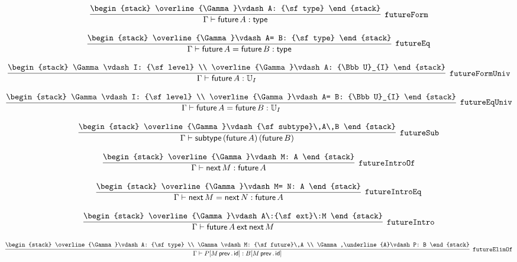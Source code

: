 \[
\infer[{\tt futureForm}]{\Gamma \vdash {\sf future}\,A: {\sf type}}{
\begin{stack}
\overline{\Gamma}\vdash A: {\sf type}
\end{stack}}
\]

\[
\infer[{\tt futureEq}]{\Gamma \vdash {\sf future}\,A= {\sf future}\,B: {\sf type}}{
\begin{stack}
\overline{\Gamma}\vdash A= B: {\sf type}
\end{stack}}
\]

\[
\infer[{\tt futureFormUniv}]{\Gamma \vdash {\sf future}\,A: {\Bbb U}_{I}}{
\begin{stack}
\Gamma \vdash I: {\sf level}
\\
\overline{\Gamma}\vdash A: {\Bbb U}_{I}
\end{stack}}
\]

\[
\infer[{\tt futureEqUniv}]{\Gamma \vdash {\sf future}\,A= {\sf future}\,B: {\Bbb U}_{I}}{
\begin{stack}
\Gamma \vdash I: {\sf level}
\\
\overline{\Gamma}\vdash A= B: {\Bbb U}_{I}
\end{stack}}
\]

\[
\infer[{\tt futureSub}]{\Gamma \vdash {\sf subtype}\,({\sf future}\,A)\,({\sf future}\,B)}{
\begin{stack}
\overline{\Gamma}\vdash {\sf subtype}\,A\,B
\end{stack}}
\]

\[
\infer[{\tt futureIntroOf}]{\Gamma \vdash {\sf next}\,M: {\sf future}\,A}{
\begin{stack}
\overline{\Gamma}\vdash M: A
\end{stack}}
\]

\[
\infer[{\tt futureIntroEq}]{\Gamma \vdash {\sf next}\,M= {\sf next}\,N: {\sf future}\,A}{
\begin{stack}
\overline{\Gamma}\vdash M= N: A
\end{stack}}
\]

\[
\infer[{\tt futureIntro}]{\Gamma \vdash {\sf future}\,A\:{\sf ext}\:{\sf next}\,M}{
\begin{stack}
\overline{\Gamma}\vdash A\:{\sf ext}\:M
\end{stack}}
\]

\[
\infer[{\tt futureElimOf}]{\Gamma \vdash P[M\, {\sf prev}\,.\,{\sf id}]: B[M\, {\sf prev}\,.\,{\sf id}]}{
\begin{stack}
\overline{\Gamma}\vdash A: {\sf type}
\\
\Gamma \vdash M: {\sf future}\,A
\\
\Gamma ,\underline{A}\vdash P: B
\end{stack}}
\]

